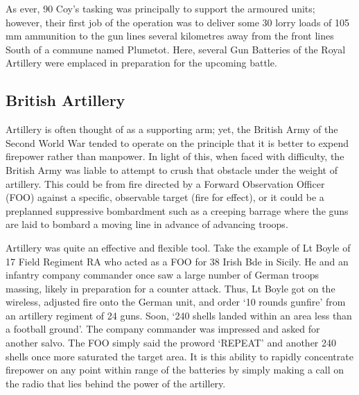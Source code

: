 \documentclass[noraggedright]{turabian-researchpaper}
\begin{document}
As ever, 90 Coy's tasking was principally to support the armoured units; however,
their first job of the operation was to deliver some 30 lorry loads of 105 mm
ammunition to the gun lines several kilometres away from the front lines South
of a commune named Plumetot.  Here, several Gun Batteries of the Royal Artillery
were emplaced in preparation for the upcoming battle. 

	\subsection{British Artillery} %

Artillery is often thought of as a supporting arm; yet, the British Army of the
Second World War tended to operate on the principle that it is better to expend 
firepower rather than manpower.  In light of this, when faced with difficulty,
the British Army was liable to attempt to crush that obstacle under the weight
of artillery.  This could be from fire directed by a Forward Observation 
Officer (FOO) against a specific, observable target (fire for effect), or it 
could be a preplanned suppressive bombardment such as a creeping barrage where 
the guns are laid to bombard a moving line in advance of advancing troops.

Artillery was quite an effective and flexible tool.  Take the example of 
Lt Boyle of 17 Field Regiment RA who acted as a FOO for 38 Irish Bde in 
Sicily.  He and an infantry company commander once saw a large number of German 
troops massing, likely in preparation for a counter attack.  Thus, Lt Boyle 
got on the wireless, adjusted fire onto the German unit, and order `10 
rounds gunfire' from an artillery regiment of 24 guns.  Soon, `240 shells
landed within an area less than a football ground'.\autocite[133]{gunfire}
The company commander was impressed and asked for another salvo.  The FOO
simply said the proword `REPEAT' and another 240 shells once more
saturated the target area.\autocite[133]{gunfire}  It is this ability to 
rapidly concentrate firepower on any point within range of the batteries
by simply making a call on the radio that lies behind the power of the
artillery.
\end{document}
